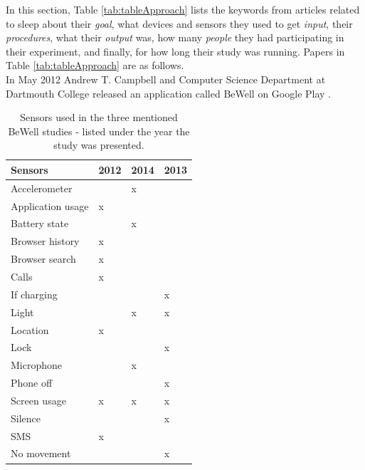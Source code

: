 \documentclass[12pt]{article} %
\begin{document}
In this section, Table \ref{tab:tableApproach} lists the keywords from articles related to sleep about their \textit{goal}, what devices and sensors they used to get \textit{input}, their \textit{procedures}, what their \textit{output} was, how many \textit{people} they had participating in their experiment, and finally, for how long their study was running. Papers in Table \ref{tab:tableApproach} are as follows. \\

In May 2012 Andrew T. Campbell and Computer Science Department at Dartmouth College released an application called BeWell on Google Play \cite{bewellDartmouth}. 

\begin{table}
\center
\begin{footnotesize}
	\begin{tabular}{|p{2.8cm} |p{1.2cm} |p{1.2cm} |p{1.2cm} |}
	\hline
	\textbf{Sensors} & \textbf{{\tiny 2012 \cite{beWell}}} & \textbf{{\tiny 2014 \cite{toss}}} & \textbf{{\tiny 2013 \cite{compare}}} \\
	\hline
Accelerometer & & x & \\
Application usage & x & & 	\\
Battery state & & x & \\
Browser history & x & & \\
Browser search & x & & \\	
Calls & x & & \\
If charging & &  & x\\
Light & & x & x\\
Location & x & & \\
Lock & &  & x\\
Microphone & & x &\\
Phone off & &  & x\\
Screen usage & x & x & x\\
Silence & &  & x\\  
SMS & x & & 	\\
No movement & &  & x\\
	\hline
	\end{tabular}
	\caption{Sensors used in the three mentioned BeWell studies - listed under the year the study was presented.}
	\label{tab:sensors}
\end{footnotesize}
\end{table}
\end{document}
